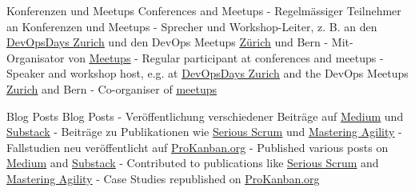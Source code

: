 {
}

\begin{cvskills}
	\cvskill
	{
			{ Konferenzen und Meetups }
			{ Conferences and Meetups }
	} %
	{
		{
			- Regelmässiger Teilnehmer an Konferenzen und Meetups \linebreak
			- Sprecher und Workshop-Leiter, z. B. an den \underline{\href{https://www.youtube.com/watch?v=8sESKZQ5sFM}{DevOpsDays Zurich}} und den DevOps Meetups \underline{\href{https://www.meetup.com/devops-meetup-zurich/events/303501438/}{Zürich}} und Bern \linebreak
			- Mit-Organisator von \underline{\href{https://www.meetup.com/lighthouselive}{Meetups}} \linebreak
		}
		{
			- Regular participant at conferences and meetups \linebreak
			- Speaker and workshop host, e.g. at \underline{\href{https://www.youtube.com/watch?v=8sESKZQ5sFM}{DevOpsDays Zurich}} and the DevOps Meetups \underline{\href{https://www.meetup.com/devops-meetup-zurich/events/303501438/}{Zurich}} and Bern \linebreak
			- Co-organiser of \underline{\href{https://www.meetup.com/lighthouselive}{meetups}} \linebreak
		}
	}
	
	\cvskill
	{
			{ Blog Posts }
			{ Blog Posts }
	} %
	{
		{
			- Veröffentlichung verschiedener Beiträge auf \underline{\href{https://medium.com/@benjihuser}{Medium}} und \underline{\href{https://substack.com/@huserben}{Substack}} \linebreak
			- Beiträge zu Publikationen wie \underline{\href{https://medium.com/serious-scrum}{Serious Scrum}} und \underline{\href{https://medium.com/mastering-agility}{Mastering Agility}} \linebreak
			- Fallstudien neu veröffentlicht auf \underline{\href{https://www.prokanban.org/blog/https-prokanban-org-blog-monte-carlo-simulations-accuracy-and-unplanned-work-a-case-study}{ProKanban.org}}
		}
		{
			- Published various posts on \underline{\href{https://medium.com/@benjihuser}{Medium}} and \underline{\href{https://substack.com/@huserben}{Substack}} \linebreak
			- Contributed to publications like \underline{\href{https://medium.com/serious-scrum}{Serious Scrum}} and \underline{\href{https://medium.com/mastering-agility}{Mastering Agility}} \linebreak
			- Case Studies republished on \underline{\href{https://www.prokanban.org/blog/https-prokanban-org-blog-monte-carlo-simulations-accuracy-and-unplanned-work-a-case-study}{ProKanban.org}} 
		}
	}
	

\end{cvskills}
